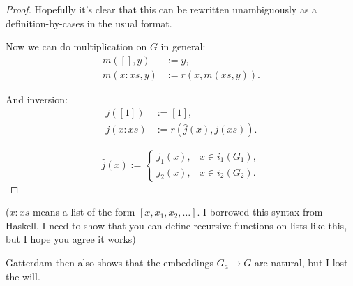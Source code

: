 \documentclass[a4paper]{article}
\theoremstyle{plain}
\theoremstyle{definition}
\begin{document}
\begin{proof}
Hopefully it's clear that this can be rewritten unambiguously as a definition-by-cases in the usual format.

Now we can do multiplication on $G$ in general:
\begin{align*}
	m([],y) &:= y, \\
	m( x:xs, y) &:= r(x,m(xs,y)).  
\end{align*}

And inversion:
\begin{align*}
	j([1]) &:= [1], \\
	j(x:xs) &:= r(\hat{j}(x), j(xs)).
\end{align*}

\[  
	\hat{j}(x) := \begin{cases} 
									j_1(x), & x \in i_1(G_1), \\
									j_2(x), & x \in i_2(G_2). 
								\end{cases} 
\]

\end{proof}

($x:xs$ means a list of the form $[x,x_1,x_2, \dots]$. I borrowed this syntax from Haskell. I need to show that you can define recursive functions on lists like this, but I hope you agree it works)

Gatterdam then also shows that the embeddings $G_a \to G$ are natural, but I lost the will.
\end{document}

